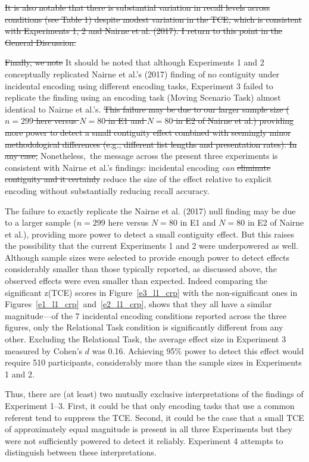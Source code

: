 \documentclass[man,natbib,floatsintext]{apa6} %
\begin{document}
\st{It is also notable that there is substantial variation in recall levels across conditions (see Table 1) despite modest variation in the TCE, which is consistent with Experiments 1, 2 and Nairne et al. (2017). I return to this point in the General Discussion.}

\st{Finally, we note} \color{red}It should be noted \color{black} that although Experiments 1 and 2 conceptually replicated Nairne et al.'s (2017) finding of no contiguity under incidental encoding using different encoding tasks, Experiment 3 failed to replicate the finding using an encoding task (Moving Scenario Task) almost identical to Nairne et al.'s. \st{This failure may be due to our larger sample size ($n=299$ here versus $N=80$ in E1 and $N=80$ in E2 of Nairne et al.) providing more power to detect a small contiguity effect combined with seemingly minor methodological differences (e.g., different list lengths and presentation rates). In any case,} \color{red}Nonetheless,\color{black}~the message across the present three experiments is consistent with Nairne et al.'s findings: incidental encoding \emph{can} \st{eliminate contiguity and it certainly} reduce the size of the effect relative to explicit encoding \color{red} without substantially reducing recall accuracy\color{black}.

\color{red}
The failure to exactly replicate the Nairne et al. (2017) null finding may be due to a larger sample ($n=299$ here versus $N=80$ in E1 and $N=80$ in E2 of Nairne et al.), providing more power to detect a small contiguity effect. But this raises the possibility that the current Experiments 1 and 2 were underpowered as well. Although sample sizes were selected to provide enough power to detect effects considerably smaller than those typically reported, as discussed above, the observed effects were even smaller than expected. Indeed comparing the significant z(TCE) scores in Figure~\ref{e3_l1_crp} with the non-significant ones in Figures~\ref{e1_l1_crp}~and~\ref{e2_l1_crp}, shows that they all have a similar magnitude---of the 7 incidental encoding conditions reported across the three figures, only the Relational Task condition is significantly different from any other. \label{power}Excluding the Relational Task, the average effect size in Experiment 3 measured by Cohen's $d$ was 0.16. Achieving 95\% power to detect this effect would require 510 participants, considerably more than the sample sizes in Experiments 1 and 2.

Thus, there are (at least) two mutually exclusive interpretations of the findings of Experiment 1--3. First, it could be that only encoding tasks that use a common referent tend to suppress the TCE. Second, it could be the case that a small TCE of approximately equal magnitude is present in all three Experiments but they were not sufficiently powered to detect it reliably. Experiment 4 attempts to distinguish between these interpretations.
\end{document}
